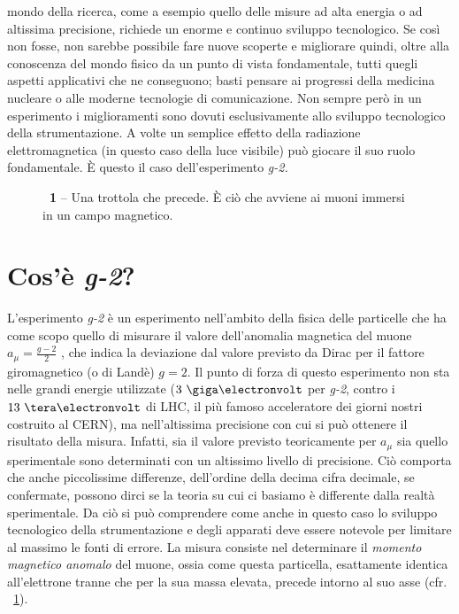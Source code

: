  mondo della ricerca, come a esempio quello delle misure ad alta energia o ad altissima precisione, richiede un enorme e continuo sviluppo tecnologico. Se così non fosse, non sarebbe possibile fare nuove scoperte e migliorare quindi, oltre alla conoscenza del mondo fisico da un punto di vista fondamentale, tutti quegli aspetti applicativi che ne conseguono; basti pensare ai progressi della medicina nucleare o alle moderne tecnologie di comunicazione.
Non sempre però in un esperimento i miglioramenti sono dovuti esclusivamente allo sviluppo tecnologico della strumentazione. A volte un semplice effetto della radiazione elettromagnetica (in questo caso della luce visibile) può giocare il suo ruolo fondamentale. È questo il caso dell'esperimento \emph{g-2.}

\begin{figure}[!b]
\begin{center}
\caption{\textbf{\figurename~1} -- Una trottola che precede. È ciò che avviene ai muoni immersi in un campo magnetico.}
\label{fig:precessione}
\end{center}
\vskip-20pt
\end{figure}

\section*{Cos'è \emph{g-2}?}
L'esperimento \emph{g-2} è un esperimento nell'ambito della fisica delle particelle che ha come scopo quello di misurare il valore dell'anomalia magnetica del muone $a_{\mu} = \frac{g-2}{2}$ \cite{gminus2}, che indica la deviazione dal valore previsto da Dirac per il fattore giromagnetico (o di Landè) $g=2$. Il punto di forza di questo esperimento non sta nelle grandi energie utilizzate ($3~\giga\electronvolt$ per \emph{g-2}, contro i $13~\tera\electronvolt$ di LHC, il più famoso acceleratore dei giorni nostri costruito al CERN), ma nell'altissima precisione con cui si può ottenere il risultato della misura. Infatti, sia il valore previsto teoricamente per $a_{\mu}$ sia quello sperimentale sono determinati con un altissimo livello di precisione. Ciò comporta che anche piccolissime differenze, dell'ordine della decima cifra decimale, se confermate, possono dirci se la teoria su cui ci basiamo è differente dalla realtà sperimentale. Da ciò si può comprendere come anche in questo caso lo sviluppo tecnologico della strumentazione e degli apparati deve essere notevole per limitare al massimo le fonti di errore.
La misura consiste nel determinare il \emph{momento magnetico anomalo} del muone, ossia come questa particella, esattamente identica all'elettrone tranne che per la sua massa elevata, precede intorno al suo asse (cfr. \figurename~\ref{fig:precessione}).

